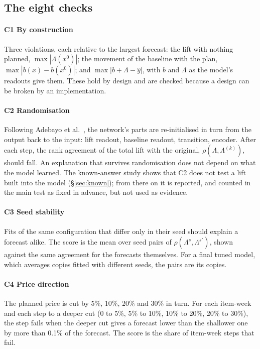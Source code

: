 \subsection{The eight checks}

\paragraph{C1 By construction} Three violations, each relative to the largest
forecast: the lift with nothing planned, $\max|\Lambda(x^{0})|$; the movement
of the baseline with the plan, $\max|b(x) - b(x^{0})|$; and
$\max|b + \Lambda - \hat y|$, with $b$ and $\Lambda$ as the model's readouts
give them. These hold by design and are checked because a design can be broken
by an implementation.

\paragraph{C2 Randomisation} Following Adebayo et al.~\cite{adebayo2018}, the
network's parts are re-initialised in turn from the output back to the input:
lift readout, baseline readout, transition, encoder. After each step, the rank
agreement of the total lift with the original, $\rho(\Lambda, \Lambda^{(k)})$,
should fall. An explanation that survives randomisation does not depend on what
the model learned. The known-answer study shows that C2 does not test a lift
built into the model (\S\ref{sec:known}); from there on it is reported, and
counted in the main test as fixed in advance, but not used as evidence.

\paragraph{C3 Seed stability} Fits of the same configuration that differ only
in their seed should explain a forecast alike. The score is the mean over seed
pairs of $\rho(\Lambda^{s}, \Lambda^{s'})$, shown against the same agreement for
the forecasts themselves. For a final tuned model, which averages copies fitted
with different seeds, the pairs are its copies.

\paragraph{C4 Price direction} The planned price is cut by 5\%, 10\%, 20\% and
30\% in turn. For each item-week and each step to a deeper cut (0 to 5\%, 5\%
to 10\%, 10\% to 20\%, 20\% to 30\%), the step fails when the deeper cut gives
a forecast lower than the shallower one by more than 0.1\% of the forecast. The
score is the share of item-week steps that fail.

